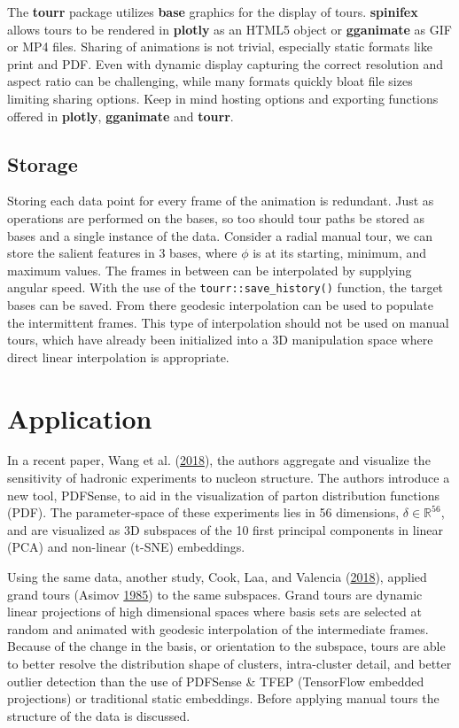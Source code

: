 The \textbf{tourr} package utilizes \textbf{base} graphics for the
display of tours. \textbf{spinifex} allows tours to be rendered in
\textbf{plotly} as an HTML5 object or \textbf{gganimate} as GIF or MP4
files. Sharing of animations is not trivial, especially static formats
like print and PDF. Even with dynamic display capturing the correct
resolution and aspect ratio can be challenging, while many formats
quickly bloat file sizes limiting sharing options. Keep in mind hosting
options and exporting functions offered in \textbf{plotly},
\textbf{gganimate} and \textbf{tourr}.

\hypertarget{storage}{%
\subsection{Storage}\label{storage}}

Storing each data point for every frame of the animation is redundant.
Just as operations are performed on the bases, so too should tour paths
be stored as bases and a single instance of the data. Consider a radial
manual tour, we can store the salient features in 3 bases, where
\(\phi\) is at its starting, minimum, and maximum values. The frames in
between can be interpolated by supplying angular speed. With the use of
the \texttt{tourr::save\_history()} function, the target bases can be
saved. From there geodesic interpolation can be used to populate the
intermittent frames. This type of interpolation should not be used on
manual tours, which have already been initialized into a 3D manipulation
space where direct linear interpolation is appropriate.

\hypertarget{sec:application}{%
\section{Application}\label{sec:application}}

In a recent paper, Wang et al.
(\protect\hyperlink{ref-wang_mapping_2018}{2018}), the authors aggregate
and visualize the sensitivity of hadronic experiments to nucleon
structure. The authors introduce a new tool, PDFSense, to aid in the
visualization of parton distribution functions (PDF). The
parameter-space of these experiments lies in 56 dimensions,
\(\delta \in \mathbb{R}^{56}\), and are visualized as 3D subspaces of
the 10 first principal components in linear (PCA) and non-linear (t-SNE)
embeddings.

Using the same data, another study, Cook, Laa, and Valencia
(\protect\hyperlink{ref-cook_dynamical_2018}{2018}), applied grand tours
(Asimov \protect\hyperlink{ref-asimov_grand_1985}{1985}) to the same
subspaces. Grand tours are dynamic linear projections of high
dimensional spaces where basis sets are selected at random and animated
with geodesic interpolation of the intermediate frames. Because of the
change in the basis, or orientation to the subspace, tours are able to
better resolve the distribution shape of clusters, intra-cluster detail,
and better outlier detection than the use of PDFSense \& TFEP
(TensorFlow embedded projections) or traditional static embeddings.
Before applying manual tours the structure of the data is discussed.

